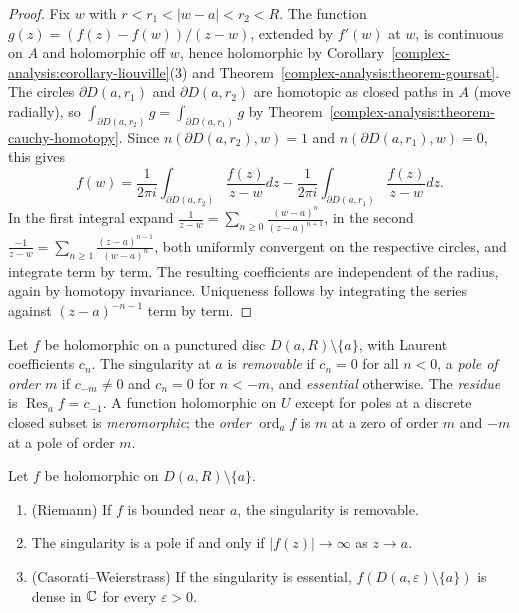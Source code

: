 \begin{proof}
Fix $w$ with $r < r_1 < |w - a| < r_2 < R$. The function $g(z) = (f(z) - f(w))/(z - w)$, extended by $f'(w)$ at $w$, is continuous on $A$ and holomorphic off $w$, hence holomorphic by
Corollary~\ref{complex-analysis:corollary-liouville}(3) and Theorem~\ref{complex-analysis:theorem-goursat}. The circles $\partial D(a, r_1)$ and $\partial D(a, r_2)$ are homotopic as closed paths in $A$ (move
radially), so $\int_{\partial D(a, r_2)}g = \int_{\partial D(a, r_1)}g$ by Theorem~\ref{complex-analysis:theorem-cauchy-homotopy}. Since $n(\partial D(a, r_2), w) = 1$ and $n(\partial D(a, r_1), w) = 0$, this
gives
\[
f(w) = \frac{1}{2\pi i}\int_{\partial D(a, r_2)}\frac{f(z)}{z - w}dz - \frac{1}{2\pi i}\int_{\partial D(a, r_1)}\frac{f(z)}{z - w}dz.
\]
In the first integral expand $\frac{1}{z - w} = \sum_{n \geq 0}\frac{(w - a)^n}{(z - a)^{n+1}}$, in the second $\frac{-1}{z - w} = \sum_{n \geq 1}\frac{(z - a)^{n-1}}{(w - a)^n}$, both uniformly convergent on the
respective circles, and integrate term by term. The resulting coefficients are independent of the radius, again by homotopy invariance. Uniqueness follows by integrating the series against
$(z - a)^{-n-1}$ term by term.
\end{proof}

\begin{definition}\label{complex-analysis:definition-singularity}
Let $f$ be holomorphic on a punctured disc $D(a, R) \setminus \{a\}$, with Laurent coefficients $c_n$. The singularity at $a$ is \emph{removable} if $c_n = 0$ for all $n < 0$, a \emph{pole of order $m$} if
$c_{-m} \neq 0$ and $c_n = 0$ for $n < -m$, and \emph{essential} otherwise. The \emph{residue} is $\operatorname{Res}_af = c_{-1}$. A function holomorphic on $U$ except for poles at a discrete closed subset
is \emph{meromorphic}; the \emph{order} $\operatorname{ord}_af$ is $m$ at a zero of order $m$ and $-m$ at a pole of order $m$.
\end{definition}

\begin{proposition}\label{complex-analysis:proposition-singularities}
Let $f$ be holomorphic on $D(a, R) \setminus \{a\}$.
\begin{enumerate}
\item (Riemann) If $f$ is bounded near $a$, the singularity is removable.
\item The singularity is a pole if and only if $|f(z)| \to \infty$ as $z \to a$.
\item (Casorati--Weierstrass) If the singularity is essential, $f(D(a, \varepsilon) \setminus \{a\})$ is dense in $\mathbb{C}$ for every $\varepsilon > 0$.
\end{enumerate}
\end{proposition}

